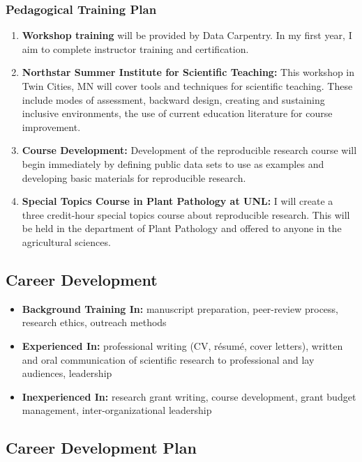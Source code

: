 \documentclass[12pt,letterpaper]{article}
\begin{document}
\subsubsection{Pedagogical Training Plan}

\begin{enumerate}
  \item \textbf{Workshop training} will be provided by Data Carpentry. In my first year, I aim to complete instructor training and certification.
  \item \textbf{Northstar Summer Institute for Scientific Teaching:} This workshop in Twin Cities, MN will cover tools and techniques for scientific teaching. These include modes of assessment, backward design, creating and sustaining inclusive environments, the use of current education literature for course improvement.
  \item \textbf{Course Development:} Development of the reproducible research course will begin immediately by defining public data sets to use as examples and developing basic materials for reproducible research.
  \item \textbf{Special Topics Course in Plant Pathology at UNL:} I will create a three credit-hour special topics course about reproducible research. This will be held in the department of Plant Pathology and offered to anyone in the agricultural sciences. 
\end{enumerate}


\subsection{Career Development}

\begin{itemize}
  \item \textbf{Background Training In: } manuscript preparation, peer-review process, research ethics, outreach methods
  \item \textbf{Experienced In: } professional writing (CV, r\'esum\'e, cover letters), written and oral communication of scientific research to professional and lay audiences, leadership
  \item \textbf{Inexperienced In: } research grant writing, course development, grant budget management, inter-organizational leadership
\end{itemize}

\subsection{Career Development Plan}
\end{document}
